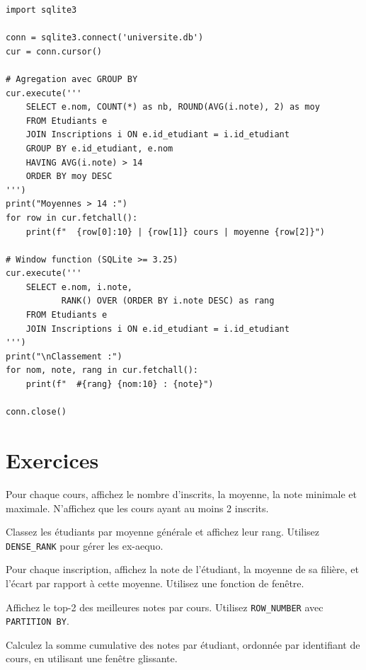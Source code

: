 \begin{codeblock}[title=\textbf{Agr\'egation et window functions avec Python}]
\begin{verbatim}
import sqlite3

conn = sqlite3.connect('universite.db')
cur = conn.cursor()

# Agregation avec GROUP BY
cur.execute('''
    SELECT e.nom, COUNT(*) as nb, ROUND(AVG(i.note), 2) as moy
    FROM Etudiants e
    JOIN Inscriptions i ON e.id_etudiant = i.id_etudiant
    GROUP BY e.id_etudiant, e.nom
    HAVING AVG(i.note) > 14
    ORDER BY moy DESC
''')
print("Moyennes > 14 :")
for row in cur.fetchall():
    print(f"  {row[0]:10} | {row[1]} cours | moyenne {row[2]}")

# Window function (SQLite >= 3.25)
cur.execute('''
    SELECT e.nom, i.note,
           RANK() OVER (ORDER BY i.note DESC) as rang
    FROM Etudiants e
    JOIN Inscriptions i ON e.id_etudiant = i.id_etudiant
''')
print("\nClassement :")
for nom, note, rang in cur.fetchall():
    print(f"  #{rang} {nom:10} : {note}")

conn.close()
\end{verbatim}
\end{codeblock}

\section*{Exercices}

\begin{exercice}
Pour chaque cours, affichez le nombre d'inscrits, la moyenne, la note
minimale et maximale. N'affichez que les cours ayant au moins 2 inscrits.
\end{exercice}

\begin{exercice}
Classez les \'etudiants par moyenne g\'en\'erale et affichez leur rang.
Utilisez \texttt{DENSE\_RANK} pour g\'erer les ex-aequo.
\end{exercice}

\begin{exercice}
Pour chaque inscription, affichez la note de l'\'etudiant, la moyenne
de sa fili\`ere, et l'\'ecart par rapport \`a cette moyenne.
Utilisez une fonction de fen\^etre.
\end{exercice}

\begin{exercice}
Affichez le top-2 des meilleures notes par cours. Utilisez
\texttt{ROW\_NUMBER} avec \texttt{PARTITION BY}.
\end{exercice}

\begin{exercice}
Calculez la somme cumulative des notes par \'etudiant, ordonn\'ee par
identifiant de cours, en utilisant une fen\^etre glissante.
\end{exercice}
